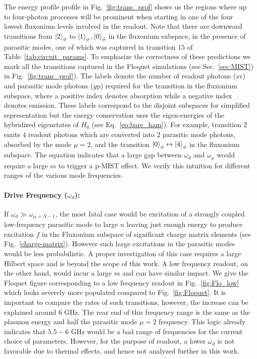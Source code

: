 \documentclass[%
reprint,
superscriptaddress,
 amsmath,amssymb,
 aps,
 prx,
longbibliography,
floatfix,
]{revtex4-2}
\begin{document}
The energy profile profile in Fig.~\ref{fig:trans_prof} shows us the regions where up to four-photon processes will be prominent when starting in one of the four lowest fluxonium levels involved in the readout. Note that there are downward transitions from $\ket{2}_\phi$ to $\ket{1}_\phi,\ket{0}_\phi$ in the fluxonium subspace, in the presence of parasitic modes, one of which was captured in transition $15$ of Table~\ref{tab:circuit_params}. To emphasize the correctness of these predictions we mark all the transitions captured in the Floquet simulations (see Sec.~\ref{sec:MIST}) in Fig.~\ref{fig:trans_prof}). The labels denote the number of readout photons ($x \mathrm{r}$) and parasitic mode photons ($y\mathrm{p}$) required for the transition in the fluxonium subspace, where a positive index denotes absorption while a negative index denotes emission. These labels correspond to the disjoint subspaces for simplified representation but the energy conservation uses the eigen-energies of the hybridized eigenstates of $H_{0}$ (see Eq.~\ref{eq:bare_ham}). For example, transition $2$ emits $4$ readout photons which are converted into $2$ parasitic mode photons, absorbed by the mode $\mu=2$, and the transition $\ket{0}_\phi\leftrightarrow \ket{4}_\phi$ in the fluxonium subspace. The equation indicates that a large gap between $\omega_d$ and $\omega_\mu$ would require a large $m$ to trigger a p-MIST effect. We verify this intuition for different ranges of the various mode frequencies. 

\paragraph{Drive Frequency ($\omega_d$):} If $\omega_d\gg \omega_{\mu=N-1}$, the most fatal case would be excitation of a strongly coupled low-frequency parasitic mode to large $n$ leaving just enough energy to produce excitation $f$ in the Fluxonium subspace of significant charge matrix elements (see Fig.~\ref{charge-matrix}). However such large excitations in the parasitic modes would be less probabilistic. A proper investigation of this case requires a large Hilbert space and is beyond the scope of this work. A low frequency readout, on the other hand, would incur a large $m$ and can have similar impact. We give the Floquet figure corresponding to a low frequency readout in Fig.~\ref{fig:Flo_low} which looks severely more populated compared to Fig.~\ref{fig:Floquet}. It is important to compare the rates of such transitions, however, the increase can be explained around $6$ GHz. The rear end of this frequency range is the same as the plasmon energy and half the parasitic mode $\mu=2$ frequency. This logic already indicates that $5.5-6$ GHz would be a bad range of frequencies for the current choice of parameters. However, for the purpose of readout, a lower $\omega_d$ is not favorable due to thermal effects, and hence not analyzed further in this work.  
\end{document}
